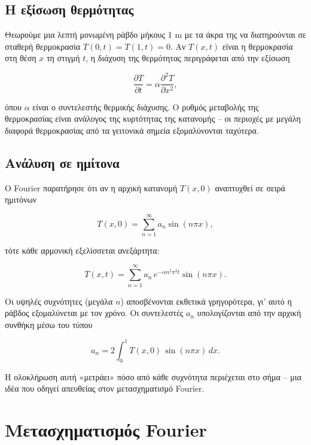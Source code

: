 \documentclass[a4paper, 11pt]{article}
\begin{document}
\subsection{Η εξίσωση
θερμότητας}\label{ux3b7-ux3b5ux3beux3afux3c3ux3c9ux3c3ux3b7-ux3b8ux3b5ux3c1ux3bcux3ccux3c4ux3b7ux3c4ux3b1ux3c2}

Θεωρούμε μια λεπτή μονωμένη ράβδο μήκους 1 m με τα άκρα της να
διατηρούνται σε σταθερή θερμοκρασία \(T(0,t)=T(1,t)=0\). Αν \(T(x,t)\)
είναι η θερμοκρασία στη θέση \(x\) τη στιγμή \(t\), η διάχυση της
θερμότητας περιγράφεται από την εξίσωση

\[
\frac{\partial T}{\partial t} = \alpha \frac{\partial^2 T}{\partial x^2},
\]

όπου \(\alpha\) είναι ο συντελεστής θερμικής διάχυσης. Ο ρυθμός
μεταβολής της θερμοκρασίας είναι ανάλογος της κυρτότητας της κατανομής
-- οι περιοχές με μεγάλη διαφορά θερμοκρασίας από τα γειτονικά σημεία
εξομαλύνονται ταχύτερα.

\subsection{Ανάλυση σε
ημίτονα}\label{ux3b1ux3bdux3acux3bbux3c5ux3c3ux3b7-ux3c3ux3b5-ux3b7ux3bcux3afux3c4ux3bfux3bdux3b1}

Ο Fourier παρατήρησε ότι αν η αρχική κατανομή \(T(x,0)\) αναπτυχθεί σε
σειρά ημιτόνων

\[
T(x,0) = \sum_{n=1}^{\infty} a_n \sin(n\pi x),
\]

τότε κάθε αρμονική εξελίσσεται ανεξάρτητα:

\[
T(x,t) = \sum_{n=1}^{\infty} a_n \, e^{-\alpha n^2 \pi^2 t} \sin(n\pi x).
\]

Οι υψηλές συχνότητες (μεγάλα \(n\)) αποσβένονται εκθετικά γρηγορότερα,
γι' αυτό η ράβδος εξομαλύνεται με τον χρόνο. Οι συντελεστές \(a_n\)
υπολογίζονται από την αρχική συνθήκη μέσω του τύπου

\[
a_n = 2\int_0^1 T(x,0)\,\sin(n\pi x)\,dx.
\]

Η ολοκλήρωση αυτή «μετράει» πόσο από κάθε συχνότητα περιέχεται στο σήμα
-- μια ιδέα που οδηγεί απευθείας στον μετασχηματισμό Fourier.

\section{Μετασχηματισμός
Fourier}\label{ux3bcux3b5ux3c4ux3b1ux3c3ux3c7ux3b7ux3bcux3b1ux3c4ux3b9ux3c3ux3bcux3ccux3c2-fourier}
\end{document}
